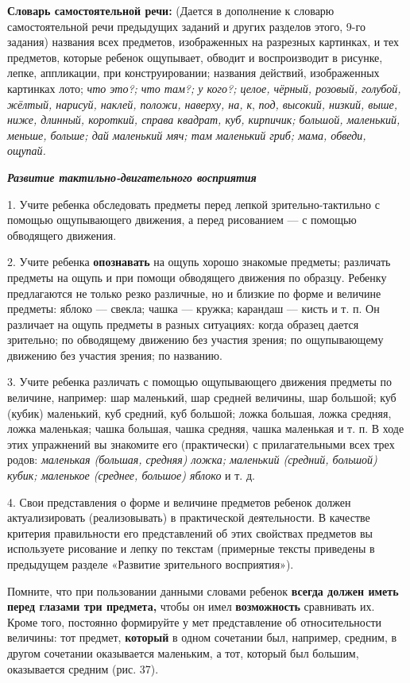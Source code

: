 \documentclass{book}
\renewcommand{\emph}[1]{\textit{#1}}
\begin{document}
\textbf{Словарь самостоятельной речи:} (Дается в дополнение к словарю
самостоятельной речи предыдущих заданий и других разделов этого, 9-го
задания) названия всех предметов, изображенных на разрезных картинках, и
тех предметов, которые ребенок ощупывает, обводит и воспроизводит в
рисунке, лепке, аппликации\textsc{,} при конструировании; названия
действий, изображенных картинках лото; \emph{что это?; что там?; у
кого?; целое, чёрный, розовый, голубой, жёлтый, нарисуй, наклей, положи,
наверху, на, к}, \emph{под, высокий, низкий, выше, ниже, длинный,
короткий, справа квадрат, куб, кирпичик; большой, маленький, меньше,
больше; дай маленький мяч; там маленький гриб; мама, обведи, ощупай.}

\emph{\textbf{Развитие тактильно-двигательного восприятия}}

1. Учите ребенка обследовать предметы перед лепкой зрительно-тактильно с
помощью ощупывающего движения, а перед рисованием --- с помощью
обводящего движения.

2. Учите ребенка \textbf{опознавать} на ощупь хорошо знакомые предметы;
различать предметы на ощупь и при помощи обводящего движения по образцу.
Ребенку предлагаются не только резко различные, но и близкие по форме и
величине предметы: яблоко --- свекла; чашка --- кружка; карандаш ---
кисть и т. п. Он различает на ощупь предметы в разных ситуациях: когда
образец дается зрительно; по обводящему движению без участия зрения; по
ощупывающему движению без участия зрения; по названию.

3. Учите ребенка различать с помощью ощупывающего движения предметы по
величине, например: шар маленький, шар средней величины, шар большой;
куб (кубик) маленький, куб средний, куб большой; ложка большая, ложка
средняя, ложка маленькая; чашка большая, чашка средняя, чашка маленькая
и т. п. В ходе этих упражнений вы знакомите его (практически) с
прилагательными всех трех родов: \emph{маленькая (большая, средняя)
ложка; маленький (средний, большой) кубик; маленькое (среднее, большое)
яблоко} и т. д.

4. Свои представления о форме и величине предметов ребенок должен
актуализировать (реализовывать) в практической деятельности. В качестве
критерия правильности его представлений об этих свойствах предметов вы
используете рисование и лепку по текстам (примерные тексты приведены в
предыдущем разделе «Развитие зрительного восприятия»).

Помните, что при пользовании данными словами ребенок \textbf{всегда
должен иметь перед глазами три предмета,} чтобы он имел
\textbf{возможность} сравнивать их. Кроме того, постоянно формируйте у
мет представление об относительности величины: тот предмет,
\textbf{который} в одном сочетании был, например, средним, в другом
сочетании оказывается маленьким, а тот, который был большим, оказывается
средним (рис. 37).
\end{document}
